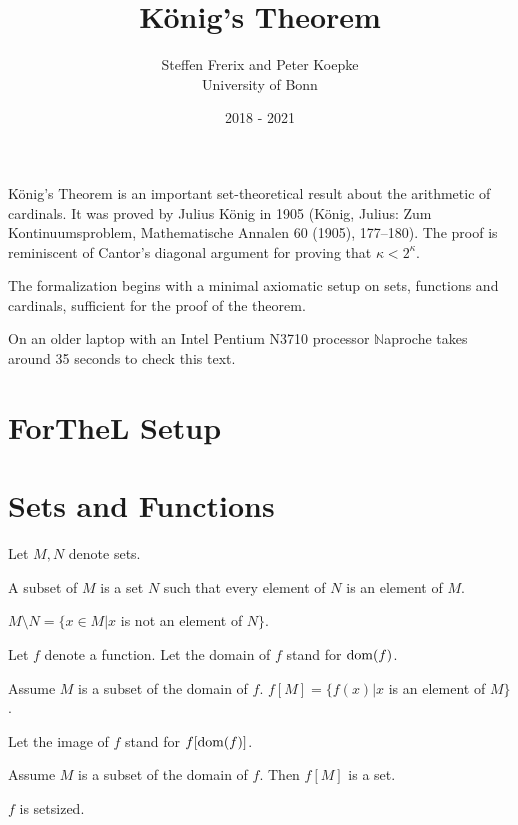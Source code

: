 \documentclass{article}
\title{König's Theorem}
\author{Steffen Frerix and Peter Koepke\\
University of Bonn}
\date{2018 - 2021}
\newcommand{\Naproche}{$\mathbb{N}$aproche}
\begin{document}
  \maketitle

König's Theorem is an important set-theoretical result about the 
arithmetic of cardinals. It was proved by Julius König in 1905 
(König, Julius: Zum Kontinuumsproblem, Mathematische Annalen 60 (1905), 177–180).
The proof is reminiscent of Cantor's diagonal argument for
proving that $\kappa < 2^\kappa$.

The formalization begins with a minimal axiomatic setup on sets, functions
and cardinals, sufficient for the proof of the theorem.

On an older laptop 
with an Intel Pentium N3710 processor \Naproche{} takes 
around 35 seconds to check this text.

\section{ForTheL Setup}

\begin{forthel}
\end{forthel}


\section{Sets and Functions}
  
\begin{forthel}
    Let $M,N$ denote sets.
    
    \begin{definition}
     A subset of $M$ is a set $N$ such that every element 
     of $N$ is an element of $M$.
    \end{definition}

    \begin{definition}
      $M \setminus N = \{x \in M | x$ is not an element of $N\}$.
    \end{definition}

    Let $f$ denote a function.
    Let the domain of $f$ stand for $\operatorname{dom}(f)$.

    \begin{definition}
      Assume $M$ is a subset of the domain of $f$. 
      $f[M] = \{f(x) | x$ is an element of $M\}$.
    \end{definition}

    Let the image of $f$ stand for $f[\operatorname{dom}(f)]$.

    \begin{axiom}
      Assume $M$ is a subset of the domain of $f$. 
      Then $f[M]$ is a set.
    \end{axiom}

    \begin{axiom}
      $f$ is setsized.
    \end{axiom}
\end{forthel}
\end{document}
